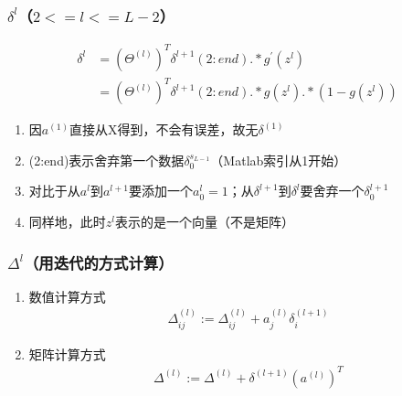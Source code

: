 

\subsubsection{$\delta^{l}$（$2<=l<=L-2$）}
\begin{equation}\begin{aligned}
	\delta^{l} &= (\Theta^{(l)})^T \delta^{l+1}(2:end) .* g^{'}(z^{l}) \\
	&= (\Theta^{(l)})^T \delta^{l+1}(2:end) .* g(z^{l}) .* (1-g(z^{l}))
\end{aligned}\end{equation}
\begin{enumerate}
	\item 因$a^{(1)}$直接从X得到，不会有误差，故无$\delta^{(1)}$
	\item (2:end)表示舍弃第一个数据$\delta_0^{s_{L-1}}$（Matlab索引从1开始）
	\item 对比于从$a^{l}$到$a^{l+1}$要添加一个$a_0^{l}=1$；从$\delta^{l+1}$到$\delta^{l}$要舍弃一个$\delta_0^{l+1}$
	\item 同样地，此时$z^{l}$表示的是一个向量（不是矩阵）
\end{enumerate}

\subsubsection{$\Delta^{l}$（用迭代的方式计算）}
\begin{enumerate}
	\item 数值计算方式
	\begin{equation}\begin{aligned}
		\Delta_{ij}^{(l)} := \Delta_{ij}^{(l)} + a_j^{(l)} \delta_i^{(l+1)}
	\end{aligned}\end{equation}
	\item 矩阵计算方式
	\begin{equation}\begin{aligned}
		\Delta^{(l)} := \Delta^{(l)} + \delta^{(l+1)} (a^{(l)})^T
	\end{aligned}\end{equation}
\end{enumerate}

